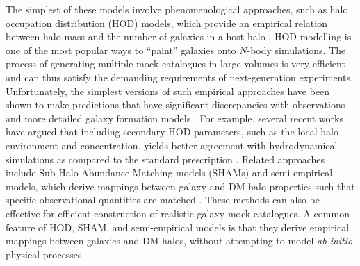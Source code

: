 \documentclass[fleqn,usenatbib]{mnras}
\begin{document}
The simplest of these models involve phenomenological approaches, such as halo occupation distribution (HOD) models, which provide an empirical relation between halo mass and the number of galaxies in a host halo \citep{2000MNRAS.311..793B,2000MNRAS.318.1144P,2001ApJ...546...20S,2004MNRAS.350.1153Y,2018ARA&A..56..435W}. HOD modelling is one of the most popular ways to  ``paint'' galaxies onto $N$-body simulations. The process of generating multiple mock catalogues in large volumes is very efficient and can thus satisfy the demanding requirements of next-generation experiments. Unfortunately, the simplest versions of such empirical approaches have been shown to make predictions that have significant discrepancies with observations and more detailed galaxy formation models \citep{2007MNRAS.374.1303C,2015MNRAS.454.3030P,2020MNRAS.491.5771B}. For example, several recent works have argued that including secondary HOD parameters, such as the local halo environment and concentration, yields better agreement with hydrodynamical simulations as compared to the standard prescription \citep{2020MNRAS.493.5506H,2020MNRAS.492.2739X,2021MNRAS.501.1603H}. 
Related approaches include Sub-Halo Abundance Matching models (SHAMs) and semi-empirical models, which derive mappings between galaxy and DM halo properties such that specific observational quantities are matched \citep{2013ApJ...770...57B,2013ApJ...768L..37T, 2013MNRAS.428.3121M,2018MNRAS.477.1822M,2018ApJ...868...92T,2019MNRAS.488.3143B}. These methods can also be effective for efficient construction of realistic galaxy mock catalogues. A common feature of HOD, SHAM, and semi-empirical models is that they derive empirical mappings between galaxies and DM halos, without attempting to model \textit{ab initio} physical processes. 
\end{document}
